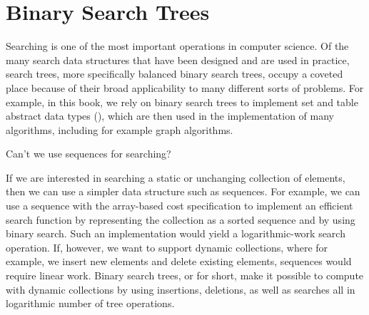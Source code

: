 \chapter{Binary Search Trees}
\label{ch:bst}
\label{ch:bsts}


Searching is one of the most important operations in computer science.
Of the many search data structures that have been designed and are
used in practice, search trees, more specifically balanced binary
search trees, occupy a coveted place because of their broad
applicability to many different sorts of problems.  For example, in
this book, we rely on binary search trees to implement set and table
abstract data types (), which are then used in the
implementation of many algorithms, including for example graph
algorithms.


\begin{question}
Can't we use sequences for searching? 
\end{question}
If we are interested in searching a static or unchanging collection of
elements, then we can use a simpler data structure such as sequences.
%
For example, we can use a sequence with the array-based cost
specification to implement an efficient search function by
representing the collection as a sorted sequence and by using binary
search.  
%
Such an implementation would yield a logarithmic-work search
operation.
%
If, however, we want to support dynamic collections, where for
example, we insert new elements and delete existing elements,
sequences would require linear work.
% 
Binary search trees, or  for short, make it possible to
compute with dynamic collections by using insertions, deletions, as
well as searches all in logarithmic number of tree operations.


